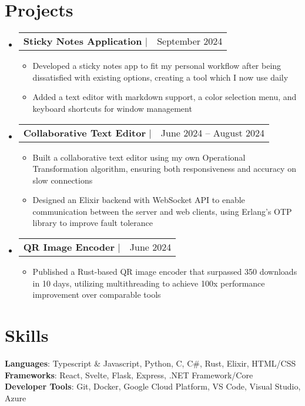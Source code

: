 \documentclass[letterpaper,11pt]{article}
\makeatletter
\newcommand{\resumeItem}[1]{
  \item\small{
    {#1 \vspace{-2pt}}
  }
}
\newcommand{\resumeProjectHeading}[2]{
    \item
    \begin{tabular*}{0.97\textwidth}{l@{\extracolsep{\fill}}r}
      \small#1 & #2 \\
    \end{tabular*}\vspace{-7pt}
}
\newcommand{\resumeSubHeadingListStart}{\begin{itemize}[leftmargin=0.15in, label={}]}
\newcommand{\resumeSubHeadingListEnd}{\end{itemize}}
\newcommand{\resumeItemListStart}{\begin{itemize}}
\newcommand{\resumeItemListEnd}{\end{itemize}\vspace{-5pt}}
\makeatother
\begin{document}
\section{Projects}
    \resumeSubHeadingListStart
      \resumeProjectHeading{\textbf{Sticky Notes Application} $|$ \href{https://github.com/github-link}{\underline{\smash{https://github.com/github-link}}}}{September 2024}
      \resumeItemListStart
        \resumeItem{Developed a sticky notes app to fit my personal workflow after being dissatisfied with existing options, creating a tool which I now use daily}
        \resumeItem{Added a text editor with markdown support, a color selection menu, and keyboard shortcuts for window management}
      \resumeItemListEnd
      \resumeProjectHeading{\textbf{Collaborative Text Editor} $|$ \href{https://deploy-link}{\underline{\smash{https://deploy-link}}}}{
        June 2024 -- August 2024}
      \resumeItemListStart
        \resumeItem{Built a collaborative text editor using my own Operational Transformation algorithm, ensuring both responsiveness and accuracy on slow connections}
        \resumeItem{Designed an Elixir backend with WebSocket API to enable communication between the server and web clients, using Erlang’s OTP library to improve fault tolerance}
      \resumeItemListEnd
      \resumeProjectHeading{\textbf{QR Image Encoder} $|$ \href{https://crates.io/crate-link
      }{\underline{\smash{https://crates.io/crate-link}
      }}}{June 2024}
      \resumeItemListStart
        \resumeItem{Published a Rust-based QR image encoder that surpassed 350 downloads in 10 days, utilizing multithreading to achieve 100x performance improvement over comparable tools}
      \resumeItemListEnd
    \resumeSubHeadingListEnd



%
\section{Skills}
 \begin{itemize}[leftmargin=0.15in, label={}]
    \small{\item{
     \textbf{Languages}{: Typescript \& Javascript, Python, C, C\#, Rust, Elixir, HTML/CSS} \\
     \textbf{Frameworks}{: React, Svelte, Flask, Express, .NET Framework/Core} \\
     \textbf{Developer Tools}{: Git, Docker, Google Cloud Platform, VS Code, Visual Studio, Azure}
    }}
 \end{itemize}


\end{document}

